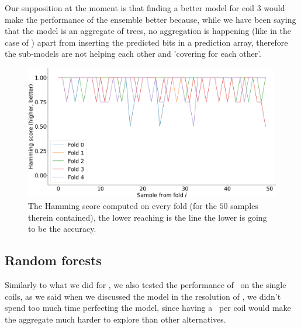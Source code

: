 Our supposition at the moment is that finding a better model for coil $3$ would make the performance of
the ensemble better because, while we have been saying that the model is an aggregate of trees, no
aggregation is happening (like in the case of \tas) apart from inserting the predicted bits in a
prediction array, therefore the sub-models are not helping each other and 'covering for each other'.

\begin{figure}[!ht]
	\centering
	\includegraphics[width=\linewidth]{img/best_dts_hs.png}
	\caption{The Hamming score computed on every fold (for the $50$ samples therein contained), the lower reaching is the line the lower is going to be the accuracy.} \label{fig:dt-qlp-hs}
\end{figure}

\subsection{Random forests}
Similarly to what we did for \qrp, we also tested the performance of \rfs\ on the single coils, as we
said when we discussed the model in the resolution of \qrp, we didn't spend too much time perfecting
the model, since having a \rf\ per coil would make the aggregate much harder to explore than other
alternatives.








